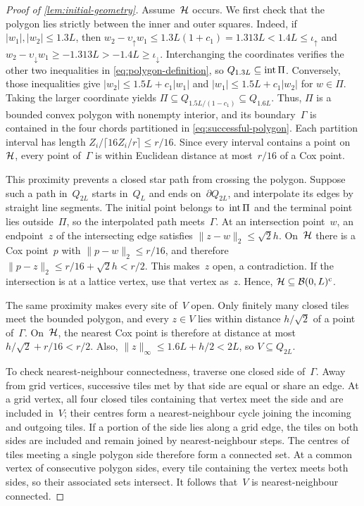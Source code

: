 \documentclass[11pt,letterpaper]{article}
\begin{document}
\begin{proof}[Proof of \cref{lem:initial-geometry}]
Assume~$\mathcal H$ occurs. We first check that the polygon lies strictly between the inner and outer squares. Indeed, if $\lvert w_1\rvert,\lvert w_2\rvert\le1.3L$, then $w_2-\upsilon_{\uparrow}w_1\le1.3L(1+c_1)=1.313L<1.4L\le \iota_{\uparrow}$ and $w_2-\upsilon_{\downarrow}w_1\ge-1.313L>-1.4L\ge \iota_{\downarrow}$. Interchanging the coordinates verifies the other two inequalities in \eqref{eq:polygon-definition}, so $Q_{1.3L}\subseteq\operatorname{int} \Pi$. Conversely, those inequalities give $\lvert w_2\rvert\le1.5L+c_1\lvert w_1\rvert$ and $\lvert w_1\rvert\le1.5L+c_1\lvert w_2\rvert$ for $w\in \Pi$. Taking the larger coordinate yields $\Pi\subseteq Q_{1.5L/(1-c_1)}\subseteq Q_{1.6L}$. Thus, $\Pi$ is a bounded convex polygon with nonempty interior, and its boundary~$\Gamma$ is contained in the four chords partitioned in \eqref{eq:successful-polygon}. Each partition interval has length $Z_i/\lceil16Z_i/r\rceil\le r/16$. Since every interval contains a point on~$\mathcal H$, every point of~$\Gamma$ is within Euclidean distance at most~$r/16$ of a Cox point.

This proximity prevents a closed star path from crossing the polygon. Suppose such a path in~$Q_{2L}$ starts in~$Q_L$ and ends on~$\partial Q_{2L}$, and interpolate its edges by straight line segments. The initial point belongs to~$\operatorname{int} \Pi$ and the terminal point lies outside~$\Pi$, so the interpolated path meets~$\Gamma$. At an intersection point~$w$, an endpoint~$z$ of the intersecting edge satisfies $\lVert z-w\rVert_2\le\sqrt2h$. On~$\mathcal H$ there is a Cox point~$p$ with $\lVert p-w\rVert_2\le r/16$, and therefore $\lVert p-z\rVert_2\le r/16+\sqrt2h<r/2$. This makes~$z$ open, a contradiction. If the intersection is at a lattice vertex, use that vertex as~$z$. Hence, $\mathcal H\subseteq\mathcal B(0,L)^{\mathrm{c}}$.

The same proximity makes every site of~$V$ open. Only finitely many closed tiles meet the bounded polygon, and every $z\in V$ lies within distance $h/\sqrt2$ of a point of~$\Gamma$. On~$\mathcal H$, the nearest Cox point is therefore at distance at most $h/\sqrt2+r/16<r/2$. Also, $\lVert z\rVert_\infty\le1.6L+h/2<2L$, so $V\subseteq Q_{2L}$.

To check nearest-neighbour connectedness, traverse one closed side of~$\Gamma$. Away from grid vertices, successive tiles met by that side are equal or share an edge. At a grid vertex, all four closed tiles containing that vertex meet the side and are included in~$V$; their centres form a nearest-neighbour cycle joining the incoming and outgoing tiles. If a portion of the side lies along a grid edge, the tiles on both sides are included and remain joined by nearest-neighbour steps. The centres of tiles meeting a single polygon side therefore form a connected set. At a common vertex of consecutive polygon sides, every tile containing the vertex meets both sides, so their associated sets intersect. It follows that~$V$ is nearest-neighbour connected.


\end{proof}
\end{document}
